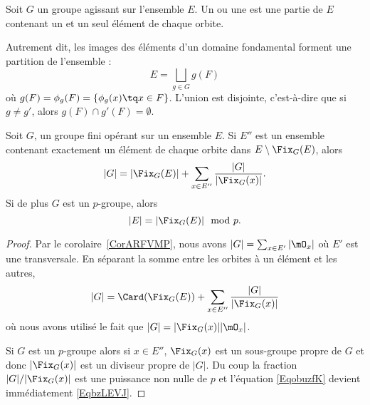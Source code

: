 \begin{definition}  \label{DefcSuYxz}
    Soit \( G\) un groupe agissant sur l'ensemble \( E\). Un  ou une  est une partie de \( E\) contenant un et un seul élément de chaque orbite.
\end{definition}
Autrement dit, les images des éléments d'un domaine fondamental forment une partition de l'ensemble :
\begin{equation}
    E=\bigsqcup_{g\in G}g(F)
\end{equation}
où  \( g(F) = \phi_g(F) = \{ \phi_g(x) \tq x \in F\} \). L'union est disjointe, c'est-à-dire que si \( g\neq g'\), alors \( g(F)\cap g'(F)=\emptyset\).




\begin{proposition}     \label{PropUyLPdp}
    Soit \( G\), un groupe fini opérant sur un ensemble \( E\). Si \( E''\) est un ensemble contenant exactement un élément de chaque orbite dans \( E\setminus\Fix_G(E)\), alors
    \begin{equation}        \label{EqobuzfK}
        | G |=| \Fix_G(E) |+\sum_{x\in E''}\frac{ | G | }{ | \Fix_G(x) | }.
    \end{equation}
    Si de plus \( G\) est un $p$-groupe, alors
    \begin{equation}    \label{EqbzLEVJ}
        | E |=| \Fix_G(E) |\mod p.
    \end{equation}
\end{proposition}

\begin{proof}
    Par le corolaire~\ref{CorARFVMP}, nous avons \( | G |=\sum_{x\in E'}| \mO_x |\) où \( E'\) est une transversale.  En séparant la somme entre les orbites à un élément et les autres,
    \begin{equation}    \label{EqeggkBs}
        | G |=\Card(\Fix_G(E))+\sum_{x\in E''}\frac{ | G | }{ | \Fix_G(x) | }
    \end{equation}  \label{EqDgYbhm}
    où nous avons utilisé le fait que \( | G |=| \Fix_G(x) | |\mO_x |\).

    Si \( G\) est un \( p\)-groupe alors si \( x\in E''\), \( \Fix_G(x)\) est un sous-groupe propre de \( G\) et donc \( | \Fix_G(x) |\) est un diviseur propre de \( | G |\). Du coup la fraction \( | G |/|\Fix_G(x)|\) est une puissance non nulle de \( p\) et l'équation \eqref{EqobuzfK} devient immédiatement \eqref{EqbzLEVJ}.
\end{proof}



